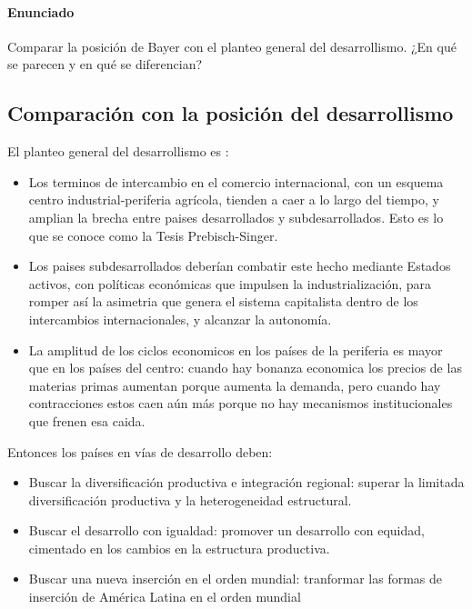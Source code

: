 \paragraph{Enunciado}
 Comparar la posición de Bayer con el planteo general del desarrollismo. ¿En qué se parecen y en qué se diferencian?

 \subsection*{Comparación con la posición del desarrollismo}

 El planteo general del desarrollismo es :
 \begin{itemize}
     \item Los terminos de intercambio en el comercio internacional, con un esquema centro industrial-periferia agrícola, tienden a caer a lo largo del tiempo,  y amplian la brecha entre paises desarrollados y subdesarrollados. Esto es lo que se conoce como la Tesis Prebisch-Singer.
     \item Los paises subdesarrollados deberían combatir este hecho mediante Estados activos, con políticas económicas que impulsen la industrialización, para romper así la asimetria que genera el sistema capitalista dentro de los intercambios internacionales, y alcanzar la autonomía.
    \item La amplitud de los ciclos economicos en los países de la periferia es mayor que en los países del centro: cuando hay bonanza economica los precios de las materias primas aumentan porque aumenta la demanda, pero cuando hay contracciones estos caen aún más porque no hay mecanismos institucionales que frenen esa caida.
 \end{itemize}

 Entonces los países en vías de desarrollo deben:

 \begin{itemize}
     \item Buscar la diversificación productiva e integración regional:  superar la limitada diversificación productiva y la heterogeneidad estructural.
     \item Buscar el desarrollo con igualdad: promover un desarrollo con equidad, cimentado en los cambios en la estructura productiva.
     \item Buscar una nueva inserción en el orden mundial: tranformar las formas de inserción de América Latina en el orden mundial
 \end{itemize}

